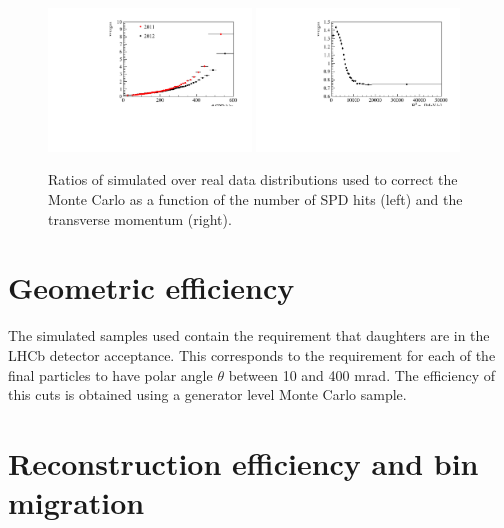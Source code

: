 \begin{figure}[h!]
\centering
\includegraphics[width=0.48\textwidth]{RKst/figs/nspd_w.pdf}
\includegraphics[width=0.48\textwidth]{RKst/figs/bpt_w.pdf}
\caption{ Ratios of simulated over real data distributions used to correct the Monte Carlo
as a function of the number of SPD hits (left) and the \Bz transverse momentum (right). }
\label{fig:b0pt_nSPD_ratios}
\end{figure}



\section{Geometric efficiency}


The simulated samples used contain the requirement that daughters are in the LHCb
detector acceptance. This corresponds to the requirement for each of the final particles
to have polar angle $\theta$ between 10 and 400 mrad. The efficiency of this
cuts is obtained using a generator level Monte Carlo sample.

\section{Reconstruction efficiency and bin migration}

